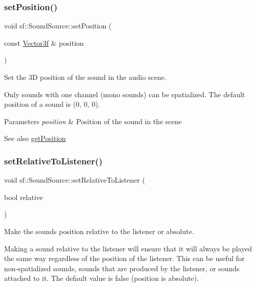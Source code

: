 \subsubsection{\texorpdfstring{set\+Position()}{setPosition()}\hspace{0.1cm}{\footnotesize\ttfamily [2/2]}}
{\footnotesize\ttfamily void sf\+::\+Sound\+Source\+::set\+Position (\begin{DoxyParamCaption}\item[{const \hyperlink{classsf_1_1_vector3}{Vector3f} \&}]{position }\end{DoxyParamCaption})}



Set the 3D position of the sound in the audio scene. 

Only sounds with one channel (mono sounds) can be spatialized. The default position of a sound is (0, 0, 0).


\begin{DoxyParams}{Parameters}
{\em position} & Position of the sound in the scene\\
\hline
\end{DoxyParams}
\begin{DoxySeeAlso}{See also}
\hyperlink{classsf_1_1_sound_source_a8d199521f55550c7a3b2b0f6950dffa1}{get\+Position} 
\end{DoxySeeAlso}
\mbox{\label{classsf_1_1_sound_source_ac478a8b813faf7dd575635b102081d0d}} 
\subsubsection{\texorpdfstring{set\+Relative\+To\+Listener()}{setRelativeToListener()}}
{\footnotesize\ttfamily void sf\+::\+Sound\+Source\+::set\+Relative\+To\+Listener (\begin{DoxyParamCaption}\item[{bool}]{relative }\end{DoxyParamCaption})}



Make the sound\textquotesingle{}s position relative to the listener or absolute. 

Making a sound relative to the listener will ensure that it will always be played the same way regardless of the position of the listener. This can be useful for non-\/spatialized sounds, sounds that are produced by the listener, or sounds attached to it. The default value is false (position is absolute).


